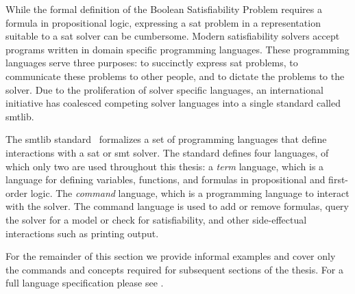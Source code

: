 While the formal definition of the Boolean Satisfiability Problem requires a
formula in propositional logic, expressing a \ac{sat} problem in a
representation suitable to a \ac{sat} solver can be cumbersome. Modern
satisfiability solvers accept programs written in domain specific programming
languages. These programming languages serve three purposes: to succinctly
express \ac{sat} problems, to communicate these problems to other people, and to
dictate the problems to the solver. Due to the proliferation of solver specific
languages, an international initiative has coalesced competing solver languages
into a single standard called \acl{smtlib}.

The \acl{smtlib} standard~\cite{BarFT-SMTLIB} formalizes a set of programming
languages that define interactions with a \ac{sat} or \ac{smt} solver. The
standard defines four languages, of which only two are used throughout this
thesis: a \emph{term} language, which is a language for defining variables,
functions, and formulas in propositional and first-order logic. The
\emph{command} language, which is a programming language to interact with the
solver. The command language is used to add or remove formulas, query the solver
for a model or check for satisfiability, and other side-effectual interactions
such as printing output.

For the remainder of this section we provide informal examples and cover only
the commands and concepts required for subsequent sections of the thesis. For a
full language specification please see \citet{BarFT-SMTLIB}.

